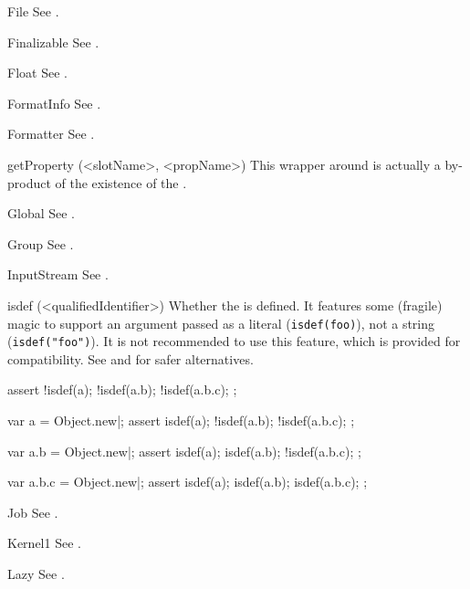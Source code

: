 \begin{urbiscriptapi}
\item[File] See .


\item[Finalizable] See .


\item[Float] See .


\item[FormatInfo] See .


\item[Formatter] See .


\item[getProperty](<slotName>, <propName>)%
  This wrapper around  is actually a by-product
  of the existence of the  .


\item[Global] See .


\item[Group] See .


\item[InputStream] See .


\item[isdef](<qualifiedIdentifier>)%
  Whether the  is defined.  It features some
  (fragile) magic to support an argument passed as a literal
  (\lstinline|isdef(foo)|), not a string (\lstinline|isdef("foo")|).  It is
  not recommended to use this feature, which is provided for \us
  compatibility.  See  and
   for safer alternatives.
\begin{urbiscript}
assert
{
  !isdef(a);
  !isdef(a.b);
  !isdef(a.b.c);
};

var a = Object.new|;
assert
{
   isdef(a);
  !isdef(a.b);
  !isdef(a.b.c);
};

var a.b = Object.new|;
assert
{
   isdef(a);
   isdef(a.b);
  !isdef(a.b.c);
};

var a.b.c = Object.new|;
assert
{
   isdef(a);
   isdef(a.b);
   isdef(a.b.c);
};
\end{urbiscript}


\item[Job] See .


\item[Kernel1] See .


\item[Lazy] See .



\end{urbiscriptapi}
